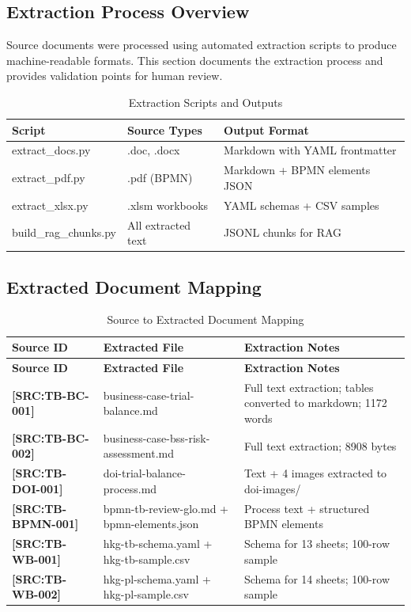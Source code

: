 \documentclass[11pt,a4paper]{article}
\newcommand{\srcref}[1]{\textcolor{sourcegreen}{\textbf{[SRC:#1]}}}
\begin{document}
\subsection{Extraction Process Overview}

Source documents were processed using automated extraction scripts to produce 
machine-readable formats. This section documents the extraction process and 
provides validation points for human review.

\begin{table}[h]
\centering
\caption{Extraction Scripts and Outputs}
\begin{tabular}{@{}L{3.5cm}L{5cm}L{5.5cm}@{}}
\toprule
\textbf{Script} & \textbf{Source Types} & \textbf{Output Format} \\
\midrule
extract\_docs.py & .doc, .docx & Markdown with YAML frontmatter \\
extract\_pdf.py & .pdf (BPMN) & Markdown + BPMN elements JSON \\
extract\_xlsx.py & .xlsm workbooks & YAML schemas + CSV samples \\
build\_rag\_chunks.py & All extracted text & JSONL chunks for RAG \\
\bottomrule
\end{tabular}
\end{table}

\subsection{Extracted Document Mapping}

\begin{longtable}{@{}C{2.5cm}L{5cm}L{6.5cm}@{}}
\caption{Source to Extracted Document Mapping} \\
\toprule
\textbf{Source ID} & \textbf{Extracted File} & \textbf{Extraction Notes} \\
\midrule
\endfirsthead
\toprule
\textbf{Source ID} & \textbf{Extracted File} & \textbf{Extraction Notes} \\
\midrule
\endhead
\srcref{TB-BC-001} & business-case-trial-balance.md & Full text extraction; tables converted to markdown; 1172 words \\
\srcref{TB-BC-002} & business-case-bss-risk-assessment.md & Full text extraction; 8908 bytes \\
\srcref{TB-DOI-001} & doi-trial-balance-process.md & Text + 4 images extracted to doi-images/ \\
\srcref{TB-BPMN-001} & bpmn-tb-review-glo.md + bpmn-elements.json & Process text + structured BPMN elements \\
\srcref{TB-WB-001} & hkg-tb-schema.yaml + hkg-tb-sample.csv & Schema for 13 sheets; 100-row sample \\
\srcref{TB-WB-002} & hkg-pl-schema.yaml + hkg-pl-sample.csv & Schema for 14 sheets; 100-row sample \\
\bottomrule
\end{longtable}
\end{document}

